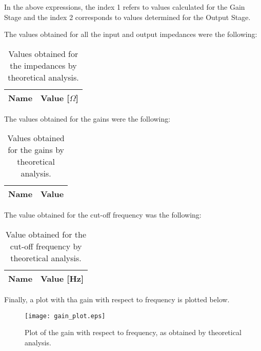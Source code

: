 In the above expressions, the index 1 refers to values calculated for the Gain Stage and the index 2 corresponds to values determined for the Output Stage.
\par
The values obtained for all the input and output impedances were the following:

\begin{table}[H]
  \centering
  \begin{tabular}{|c|c|}
    \hline    
    {\bf Name} & {\bf Value [$\Omega$]} \\ \hline
    
  \end{tabular}
  \caption{Values obtained for the impedances by theoretical analysis.}
  \label{tab:theoretical_impedances}
\end{table}

The values obtained for the gains were the following:

\begin{table}[H]
  \centering
  \begin{tabular}{|c|c|}
    \hline    
    {\bf Name} & {\bf Value} \\ \hline
    
  \end{tabular}
  \caption{Values obtained for the gains by theoretical analysis.}
  \label{tab:theoretical_gains}
\end{table}


The value obtained for the cut-off frequency was the following:

\begin{table}[H]
  \centering
  \begin{tabular}{|c|c|}
    \hline    
    {\bf Name} & {\bf Value [Hz]} \\ \hline
    
  \end{tabular}
  \caption{Value obtained for the cut-off frequency by theoretical analysis.}
  \label{tab:theoretical_cutoff}
\end{table}

Finally, a plot with tha gain with respect to frequency is plotted below.

\begin{figure}[H] \centering
  \texttt{[image: gain\_plot.eps]}
  \caption{Plot of the gain with respect to frequency, as obtained by theoretical analysis.}
  \label{fig:gain_plot}
\end{figure}

